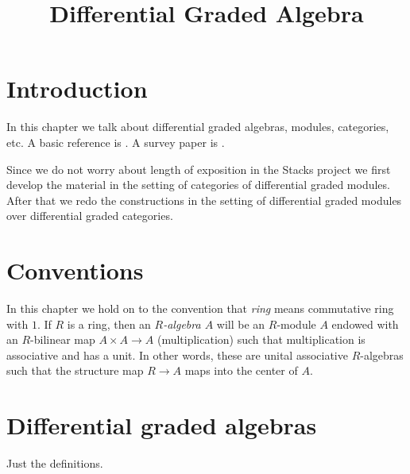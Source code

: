 

%


\title{Differential Graded Algebra}


\maketitle

\label{section-phantom}

\tableofcontents

\section{Introduction}
\label{section-introduction}

\noindent
In this chapter we talk about differential graded algebras, modules,
categories, etc. A basic reference is \cite{Keller-Deriving}.
A survey paper is \cite{Keller-survey}.

\medskip\noindent
Since we do not worry about length of exposition in the Stacks project
we first develop the material in the setting of categories of differential
graded modules. After that we redo the constructions in the setting of
differential graded modules over differential graded categories.



\section{Conventions}
\label{section-conventions}

\noindent
In this chapter we hold on to the convention that {\it ring} means
commutative ring with $1$. If $R$ is a ring, then an {\it $R$-algebra $A$}
will be an $R$-module $A$ endowed with an $R$-bilinear map $A \times A \to A$
(multiplication) such that multiplication is associative and has a unit.
In other words, these are unital associative $R$-algebras
such that the structure map $R \to A$ maps into the center of $A$.




\section{Differential graded algebras}
\label{section-dga}


\noindent
Just the definitions.

